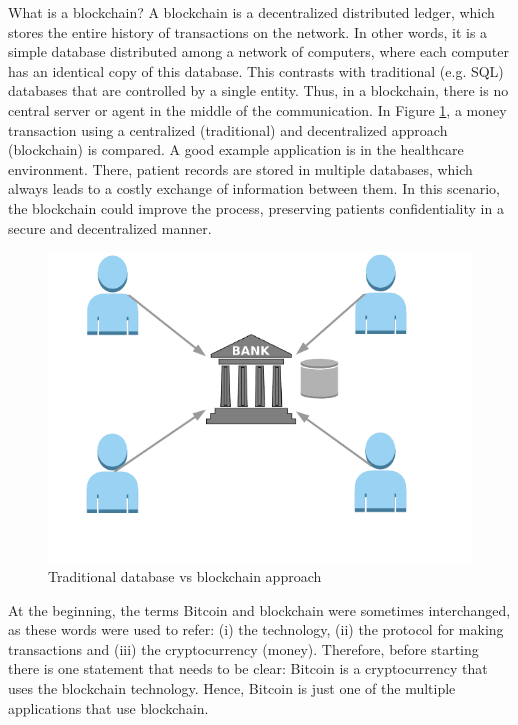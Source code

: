 What is a blockchain? A blockchain is a decentralized distributed ledger, which stores the entire history of transactions on the network. In other words, it is a simple database distributed among a network of computers, where each computer has an identical copy of this database. This contrasts with traditional (e.g. SQL) databases that are controlled by a single entity. Thus, in a blockchain, there is no central server or agent in the middle of the communication. In Figure \ref{fig:CentralizedvsDecentralized}, a money transaction using a centralized (traditional) and decentralized approach (blockchain) is compared. A good example application is in the healthcare environment. There, patient records are stored in multiple databases, which always leads to a costly exchange of information between them. In this scenario, the blockchain could improve the process, preserving patients confidentiality in a secure and decentralized manner.

\begin{figure}[bth]
	\includegraphics[width=1\linewidth]{gfx/cenVsDec}    
  	\caption{Traditional database vs blockchain approach}
  	\label{fig:CentralizedvsDecentralized}
\end{figure}

At the beginning, the terms Bitcoin and blockchain were sometimes interchanged, as these words were used to refer: (i) the technology, (ii) the protocol for making transactions and (iii) the cryptocurrency (money). Therefore, before starting there is one statement that needs to be clear: Bitcoin is a cryptocurrency that uses the blockchain technology. Hence, Bitcoin is just one of the multiple applications that use blockchain. 

